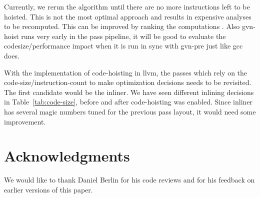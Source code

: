 \documentclass{sig-alternate}
\begin{document}
Currently, we rerun the algorithm until there are no more instructions left to
be hoisted. This is not the most optimal approach and results in expensive
analyses to be recomputed. This can be improved by ranking the computations
\cite{rosen1988global}. Also gvn-hoist runs very early in the pass pipeline, it
will be good to evaluate the codesize/performance impact when it is run in sync
with gvn-pre just like gcc does.

With the implementation of code-hoisting in llvm, the passes which rely on the
code-size/instruction-count to make optimization decisions needs to be
revisited. The first candidate would be the inliner. We have seen different
inlining decisions in Table~\ref{tab:code-size}, before and after
code-hoisting was enabled.  Since inliner has several magic numbers tuned for
the previous pass layout, it would need some improvement.

\section{Acknowledgments}
We would like to thank Daniel Berlin for his code reviews and for his feedback
on earlier versions of this paper.


{\small

}
\end{document}
